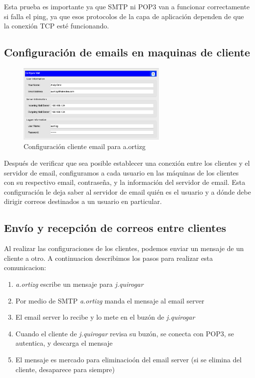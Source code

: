 \documentclass[10pt]{article}
\begin{document}
Esta prueba es importante ya que SMTP ni POP3 van a funcionar correctamente si falla el ping, ya que esos protocolos de la capa de aplicación dependen de que la conexión TCP esté funcionando.

\subsection{Configuración de emails en maquinas de cliente}

\begin{figure}[H]
    \centering
    \includegraphics[width=0.65\textwidth]{lab-01-screenshots/45-3-client-config.png}
    \caption{Configuración cliente email para a.ortizg}
\end{figure}

Después de verificar que sea posible establecer una conexión entre los clientes y el servidor de email, configuramos a cada usuario en las máquinas de los clientes con su respectivo email, contraseña, y la información del servidor de email. Esta configuración le deja saber al servidor de email quién es el usuario y a dónde debe dirigir correos destinados a un usuario en particular.

\subsection{Envío y recepción de correos entre clientes}
Al realizar las configuraciones de los clientes, podemos enviar un mensaje de un cliente a otro. A continuacion describimos los pasos para realizar esta comunicacion:
\begin{enumerate}
\item \textit{a.ortizg} escribe un mensaje para \textit{j.quirogar}
\item Por medio de SMTP \textit{a.ortizg} manda el mensaje al email server
\item El email server lo recibe y lo mete en el buzón de \textit{j.quirogar}
\item Cuando el cliente de \textit{j.quirogar} revisa su buzón, se conecta con POP3, se autentica, y descarga el mensaje
\item El mensaje es mercado para eliminacioón del email server (si se elimina del cliente, desaparece para siempre)
\end{enumerate}
\end{document}
